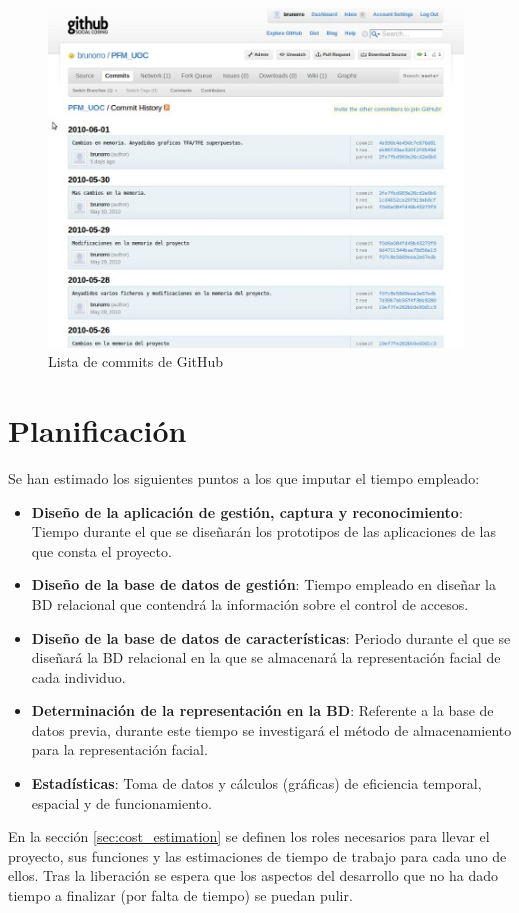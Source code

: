 \begin{figure}
	\centering
	\includegraphics[width=11cm]{imagenes/interfazGit.jpg}
	\caption{Lista de commits de GitHub}
	\label{fig:interface_git}
\end{figure}


\section{Planificación}
Se han estimado los siguientes puntos a los que imputar el tiempo empleado:
\begin{itemize}
	\item{\textbf{Diseño de la aplicación de gestión, captura y reconocimiento}: Tiempo durante el que se diseñarán los prototipos de las aplicaciones de las que consta el proyecto.}
	\item{\textbf{Diseño de la base de datos de gestión}: Tiempo empleado en diseñar la BD relacional que contendrá la información sobre el control de accesos.}
	\item{\textbf{Diseño de la base de datos de características}: Periodo durante el que se diseñará la BD relacional en la que se almacenará la representación facial de cada individuo.}
	\item{\textbf{Determinación de la representación en la BD}: Referente a la base de datos previa, durante este tiempo se investigará el método de almacenamiento para la representación facial.}
	\item{\textbf{Estadísticas}: Toma de datos y cálculos (gráficas) de eficiencia temporal, espacial y de funcionamiento.}
\end{itemize}
En la sección \ref{sec:cost_estimation} se definen los roles necesarios para llevar el proyecto, sus funciones y las estimaciones de tiempo de trabajo para cada uno de ellos. Tras la liberación se espera que los aspectos del desarrollo que no ha dado tiempo a finalizar (por falta de tiempo) se puedan pulir.
